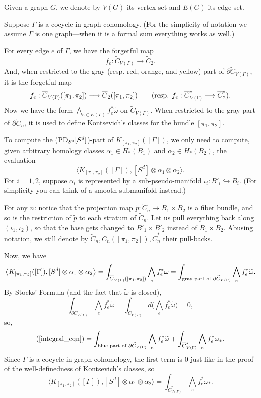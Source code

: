 \documentclass[11pt]{article}
\theoremstyle{definition}
\theoremstyle{remark}
\def\wt#1{\widetilde{#1}}
\def\ov#1{\overline{#1}}
\def\tn#1{\textnormal{#1}}
\begin{document}
Given a graph $G$, we denote by $V(G)$ its vertex set and $E(G)$ its edge set. 

Suppose $\Gamma$ is a cocycle in graph cohomology. (For the simplicity of notation we assume $\Gamma$ is one graph---when it is a formal sum everything works as well.)

For every edge $e$ of $\Gamma$, we have the forgetful map 
$$f_e:\wt{C}_{V(\Gamma)}\longrightarrow\wt{C}_2.$$
And, when restricted to the gray (resp. red, orange, and yellow) part of $\partial\wt{C}_{V(\Gamma)}$, it is the forgetful map
$$f_e:\ov{C}_{V(\Gamma)}([\pi_1,\pi_2])\longrightarrow\ov{C}_2([\pi_1,\pi_2]) \qquad (\tn{resp. } f_e:\ov{C}^*_{V(\Gamma)}\longrightarrow\ov{C}^*_2).$$
Now we have the form $\bigwedge_{e\in E(\Gamma)}f_e^*\wt{\omega}$ on $\wt{C}_{V(\Gamma)}$. 
When restricted to the gray part of $\partial\wt{C}_n$, it is used to define Kontsevich's classes for the bundle $[\pi_1,\pi_2]$. 

To compute the ($\tn{PD}_{S^d}[S^d]$)-part of $K_{[\pi_1,\pi_2]}([\Gamma])$, we only need to compute, given arbitrary homology classes $\alpha_1\in H_*(B_1)$ and $\alpha_2\in H_*(B_2)$, the evaluation
$$\big\langle K_{[\pi_1,\pi_2]}([\Gamma]), [S^d]\otimes\alpha_1\otimes\alpha_2 \big\rangle.$$
For $i=1,2$, suppose $\alpha_i$ is represented by a sub-pseudo-manifold $\iota_i:B'_i\hookrightarrow B_i$. (For simplicity you can think of a smooth submanifold instead.)

For any $n$: notice that the projection map 
$\wt{p}:\wt{C}_n\to B_1\times B_2$
is a fiber bundle, and so is the restriction of $\wt{p}$ to each stratum of $\wt{C}_n$.
Let us pull everything back along $(\iota_1,\iota_2)$, so that the base gets changed to $B'_1\times B'_2$ instead of $B_1\times B_2$. 
Abusing notation, we still denote by
$\wt{C}_n,\ov{C}_n([\pi_1,\pi_2]),\ov{C}^*_n$
their pull-backs. 

Now, we have 
\begin{equation}
\label{integral_eqn}
\big\langle K_{[\pi_1,\pi_2]}([\Gamma]), [S^d]\otimes\alpha_1\otimes\alpha_2 \big\rangle=
\int_{\ov{C}_{V(\Gamma)}([\pi_1,\pi_2])}\bigwedge_{e}f_e^*{\omega}=
\int_{\tn{gray part of }\partial\wt{C}_{V(\Gamma)}}\bigwedge_{e}f_e^*\wt{\omega}.
\end{equation}
By Stocks' Formula (and the fact that $\wt\omega$ is closed), 
$$\int_{\partial\wt{C}_{V(\Gamma)}}\bigwedge_{e}f_e^*\wt{\omega}=\int_{\wt{C}_{V(\Gamma)}}d\Big(\bigwedge_{e}f_e^*\wt{\omega}\Big)=0,$$
so, 
$$(\ref{integral_eqn})=\int_{\tn{blue part of }\partial\wt{C}_{V(\Gamma)}}\bigwedge_{e}f_e^*\wt{\omega}+\int_{\ov{C}^*_{V(\Gamma)}}\bigwedge_{e}f_e^*{\omega_*}.$$
Since $\Gamma$ is a cocycle in graph cohomology, the first term is 0 just like in the proof of the well-definedness of Kontsevich's classes, so
$$\big\langle K_{[\pi_1,\pi_2]}([\Gamma]), [S^d]\otimes\alpha_1\otimes\alpha_2 \big\rangle=
\int_{\ov{C}^*_{V(\Gamma)}}\bigwedge_{e}f_e^*{\omega_*}.$$
\end{document}
